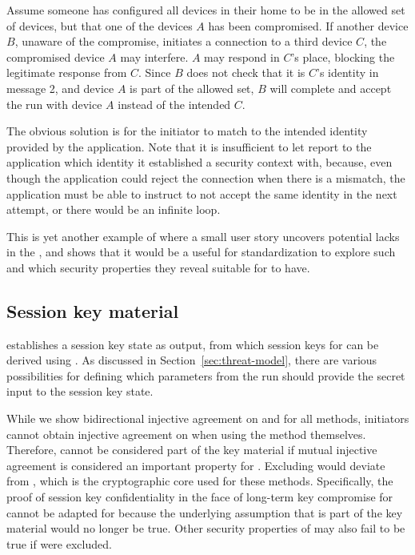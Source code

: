 \documentclass[runningheads,draft,x11names]{llncs}
\begin{document}
%
Assume someone has configured all devices in their home to be in the allowed
set of devices, but that one of the devices $A$ has been compromised.
%
If another device $B$, unaware of the compromise, initiates a connection to a
third device $C$, the compromised device $A$ may interfere.
%
$A$ may respond in $C$'s place, blocking the legitimate response from $C$.
%
Since $B$ does not check that it is $C$'s identity in message 2, and device $A$
is part of the allowed set, $B$ will complete and accept the \mEdhoc{} run
with device $A$ instead of the intended $C$.

%
The obvious solution is for the initiator to match \mIdcredr{} to the intended
identity provided by the application.
%
Note that it is insufficient to let \mEdhoc{} report to the application which
identity it established a security context with, because, even though the
application could reject the connection when there is a mismatch, the
application must be able to instruct \mEdhoc{} to not accept the same identity
in the next attempt, or there would be an infinite loop.
%

This is yet another example of where a small user story uncovers
potential lacks in the \mSpec, and shows that it would be a useful for
standardization to explore such and which security properties they reveal
suitable for \mEdhoc{} to have.
%

\subsection{Session key material}
\label{sec:sessionKeyMaterial}
\mEdhoc{} establishes a session key state as output, from which session keys for
\mOscore{} can be derived using \mHkdf{}.
%
As discussed in Section~\ref{sec:threat-model}, there are various
possibilities for defining which parameters from the \mEdhoc{} run should
provide the secret input to the session key state.

While we show bidirectional injective agreement on \mGx{} and \mGy{}
for all methods, initiators cannot obtain injective agreement on \mGiy{} when
using the \mStat{} method themselves.
%
Therefore, \mGiy{} cannot be considered part of the key material if mutual
injective agreement is considered an important property for \mEdhoc{}.
%
Excluding \mGiy{} would deviate from \mOptls{}, which is the cryptographic core
used for these methods.
%
Specifically, the proof of session key confidentiality in the face of long-term
key compromise for \mOptls{} cannot be adapted for \mEdhoc{} because the
underlying assumption that \mGiy{} is part of the key material would no longer
be true.
%
Other security properties of \mOptls{} may also fail to be true if
\mGiy{} were excluded.
%
\end{document}
